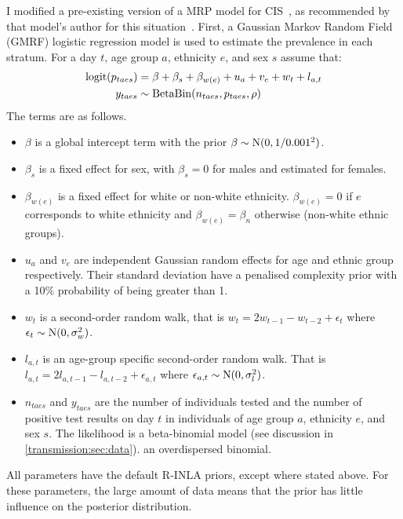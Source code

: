 \documentclass[thesis.tex]{subfiles}
\begin{document}
I modified a pre-existing version of a MRP model for CIS~\autocite{pouwelsMRPvaccination}, as recommended by that model's author for this situation~.
First, a Gaussian Markov Random Field (GMRF) logistic regression model is used to estimate the prevalence in each stratum.
For a day $t$, age group $a$, ethnicity $e$, and sex $s$ assume that:
\begin{align}
    \operatorname{logit}(p_{taes}) &= \beta + \beta_s + \beta_{w(e)} + u_a + v_e + w_t + l_{a,t} \\
    y_{taes} &\sim \operatorname{BetaBin}(n_{taes}, p_{taes}, \rho)
\end{align}
The terms are as follows.
\begin{itemize}
    \item $\beta$ is a global intercept term with the prior $\beta \sim \operatorname{N}(0, 1/0.001^2)$.
    \item $\beta_s$ is a fixed effect for sex, with $\beta_s = 0$ for males and estimated for females.
    \item $\beta_{w(e)}$ is a fixed effect for white or non-white ethnicity. $\beta_{w(e)} = 0$ if $e$ corresponds to white ethnicity and $\beta_{w(e)} = \beta_{n}$ otherwise (\ie non-white ethnic groups).%
    \item $u_a$ and $v_e$ are independent Gaussian random effects for age and ethnic group respectively. Their standard deviation have a penalised complexity prior with a 10\% probability of being greater than 1.
    \item $w_t$ is a second-order random walk, that is $w_t = 2w_{t-1} - w_{t-2} + \epsilon_t$ where $\epsilon_t \sim \operatorname{N}(0, \sigma_w^2)$.
    \item $l_{a,t}$ is an age-group specific second-order random walk. That is $l_{a,t} = 2l_{a,t-1} - l_{a,t-2} + \epsilon_{a,t}$ where $\epsilon_{a,t} \sim \operatorname{N}(0, \sigma_l^2)$.
    \item $n_{taes}$ and $y_{taes}$ are the number of individuals tested and the number of positive test results on day $t$ in individuals of age group $a$, ethnicity $e$, and sex $s$. The likelihood is a beta-binomial model (see discussion in \cref{transmission:sec:data}). an overdispersed binomial. 
\end{itemize}
All parameters have the default R-INLA priors, except where stated above.
For these parameters, the large amount of data means that the prior has little influence on the posterior distribution.
\end{document}

